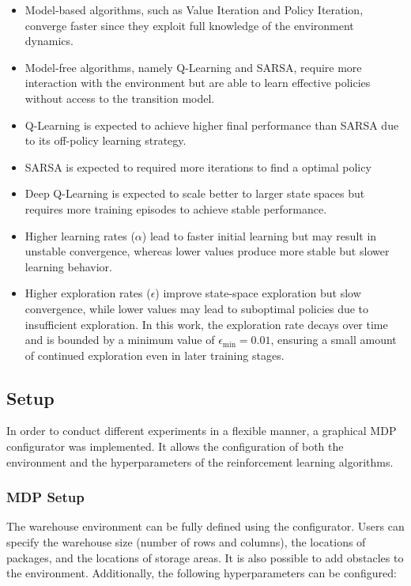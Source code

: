 \documentclass[a4paper,11pt]{article}
\theoremstyle{definition}
\begin{document}
\begin{itemize}
    \item Model-based algorithms, such as Value Iteration and Policy Iteration, converge faster since they exploit full knowledge of the environment dynamics.
    
    \item Model-free algorithms, namely Q-Learning and SARSA, require more interaction with the environment but are able to learn effective policies without access to the transition model.
    
    \item Q-Learning is expected to achieve higher final performance than SARSA due to its off-policy learning strategy.

    \item SARSA is expected to required more iterations to find a optimal policy
    
    \item Deep Q-Learning is expected to scale better to larger state spaces but requires more training episodes to achieve stable performance.

    \item Higher learning rates ($\alpha$) lead to faster initial learning but may result in unstable convergence, whereas lower values produce more stable but slower learning behavior.

    \item Higher exploration rates ($\epsilon$) improve state-space exploration but slow convergence, while lower values may lead to suboptimal policies due to insufficient exploration. In this work, the exploration rate decays over time and is bounded by a minimum value of $\epsilon_{\min} = 0.01$, ensuring a small amount of continued exploration even in later training stages.
\end{itemize}

\subsection{Setup}
In order to conduct different experiments in a flexible manner, a graphical MDP configurator was implemented. 
It allows the configuration of both the environment and the hyperparameters of the reinforcement learning algorithms.

\subsubsection{MDP Setup}
The warehouse environment can be fully defined using the configurator. Users can specify the warehouse size (number of rows and columns), the locations of packages, and the locations of storage areas. It is also possible to add obstacles to the environment. Additionally, the following hyperparameters can be configured:
\end{document}
